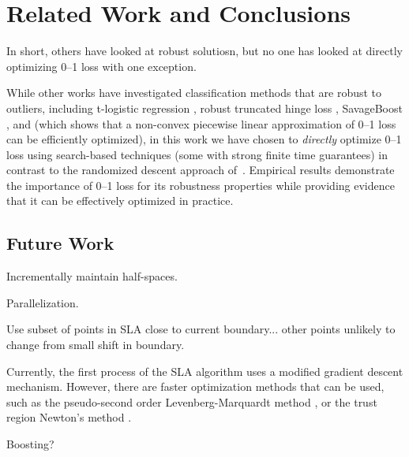 \section{Related Work and Conclusions}
\label{cha:conclusions}

\MYCOMMENT
In short, others have looked at robust solutiosn, but no one
has looked at directly optimizing 0--1 loss with one
exception.
\ENDMYCOMMENT

While other works have investigated classification methods that are
robust to outliers, including t-logistic regression \cite{Ding},
robust truncated hinge loss \cite{wu07}, SavageBoost
\cite{lossdesign}, and \cite{collobert} (which shows that a non-convex
piecewise linear approximation of 0--1 loss can be
efficiently optimized), in this work we have chosen to \emph{directly}
optimize 0--1 loss using search-based techniques (some with strong
finite time guarantees) in contrast to the randomized descent approach
of~\cite{ling}.  Empirical results demonstrate the
importance of 0--1 loss for its robustness properties while providing
evidence that it can be effectively optimized in practice.

\MYCOMMENT

\subsection{Future Work}
\label{sec:concl.futurework}

Incrementally maintain half-spaces.

Parallelization.

Use subset of points in SLA close to current boundary... other
points unlikely to change from small shift in boundary.

Currently, the first process of the SLA algorithm uses a modified
gradient descent mechanism. However, there are faster optimization
methods that can be used, such as the pseudo-second order
Levenberg-Marquardt method \cite{Marquardt}, or the trust region
Newton's method \cite{Steihaug}.

Boosting?

\ENDMYCOMMENT
